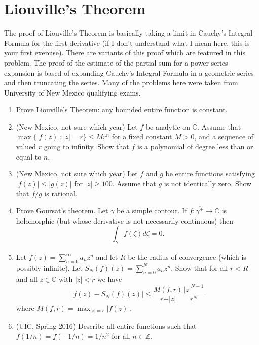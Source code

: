 \documentclass[a4paper,10pt]{article}
\newcommand{\ZZ}{\mathbb{Z}}
\newcommand{\CC}{\mathbb{C}}
\begin{document}
\newpage 

\section{Liouville's Theorem}

The proof of Liouville's Theorem is basically taking a limit in Cauchy's Integral Formula for the first derivative (if I don't understand what I mean here, this is your first exercise). 
There are variants of this proof which are featured in this problem.
The proof of the estimate of the partial sum for a power series expansion is based of expanding Cauchy's Integral Formula in a geometric series and then truncating the series. 
Many of the problems here were taken from University of New Mexico qualifying exams.

\begin{enumerate}
	\item Prove Liouville's Theorem: any bounded entire function is constant. 

	\item (New Mexico, not sure which year) %
	Let $f$ be analytic on $\CC$. 
	Assume that $\max \lbrace \vert f(z) \vert : \vert z \vert = r \rbrace \leq M r^n$ for a fixed constant $M>0$, and a sequence of valued $r$ going to infinity. 
	Show that $f$ is a polynomial of degree less than or equal to $n$. 
	
	\item (New Mexico, not sure which year) 
	Let $f$ and $g$ be entire functions satisfying $\vert f(z) \vert \leq \vert g(z) \vert$ for $\vert z \vert \geq 100$. Assume that $g$ is not identically zero. Show that $f/g$ is rational. 
	
	\item Prove Goursat's theorem. Let $\gamma$ be a simple contour. If $f:\overline{\gamma^+} \to \CC$ is holomorphic (but whose derivative is not necessarily continuous) then 
	$$ \int_{\gamma} f(\zeta) d\zeta = 0. $$
	
	
	\item Let $f(z) = \sum_{n=0}^{\infty}a_nz^n$ and let $R$ be the radius of convergence (which is possibly infinite). Let $S_N(f)(z) = \sum_{n=0}^N a_n z^n$. 
	Show that for all $r<R$ and all $z \in \CC$ with $\vert z \vert < r$ we have 
	$$ \vert f(z) - S_N(f)(z) \vert \leq \frac{M(f,r)}{r - \vert z \vert} \frac{\vert z \vert^{N+1}}{r^{N}} $$ 
	where $ M(f,r) = \max_{\vert z \vert = r} \vert f(z) \vert. $
	
	\item (UIC, Spring 2016)
	Describe all entire functions such that $f(1/n) = f(-1/n) = 1/n^2$ for all $n\in \ZZ$.
	


\end{enumerate}
\end{document}

